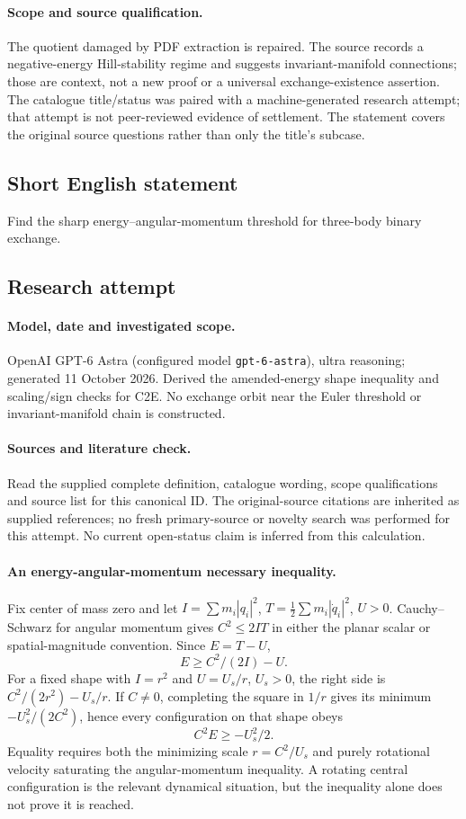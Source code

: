 \documentclass[11pt]{article}
\begin{document}
\paragraph{Scope and source qualification.}The quotient damaged by PDF extraction is repaired. The source records a negative-energy Hill-stability regime and suggests invariant-manifold connections; those are context, not a new proof or a universal exchange-existence assertion. The catalogue title/status was paired with a machine-generated research attempt; that attempt is not peer-reviewed evidence of settlement. The statement covers the original source questions rather than only the title’s subcase.
\subsection{Short English statement}
Find the sharp energy–angular-momentum threshold for three-body binary exchange.
\subsection{Research attempt}
\paragraph{Model, date and investigated scope.}
OpenAI GPT-6 Astra (configured model \texttt{gpt-6-astra}), ultra reasoning; generated 11 October 2026. Derived the amended-energy shape inequality and scaling/sign checks for C2E. No exchange orbit near the Euler threshold or invariant-manifold chain is constructed.

\paragraph{Sources and literature check.}
Read the supplied complete definition, catalogue wording, scope qualifications and source list for this canonical ID. The original-source citations are inherited as supplied references; no fresh primary-source or novelty search was performed for this attempt. No current open-status claim is inferred from this calculation.

\paragraph{An energy-angular-momentum necessary inequality.}Fix center of mass zero and let \(I=\sum m_i|q_i|^2\), \(T=\tfrac12\sum m_i|\dot q_i|^2\), \(U>0\). Cauchy--Schwarz for angular momentum gives \(C^2\le2IT\) in either the planar scalar or spatial-magnitude convention. Since \(E=T-U\),
\[E\ge C^2/(2I)-U.
\]
For a fixed shape with \(I=r^2\) and \(U=U_s/r\), \(U_s>0\), the right side is \(C^2/(2r^2)-U_s/r\). If \(C\ne0\), completing the square in \(1/r\) gives its minimum \(-U_s^2/(2C^2)\), hence every configuration on that shape obeys
\[C^2E\ge-U_s^2/2.
\]
Equality requires both the minimizing scale \(r=C^2/U_s\) and purely rotational velocity saturating the angular-momentum inequality. A rotating central configuration is the relevant dynamical situation, but the inequality alone does not prove it is reached.
\end{document}
